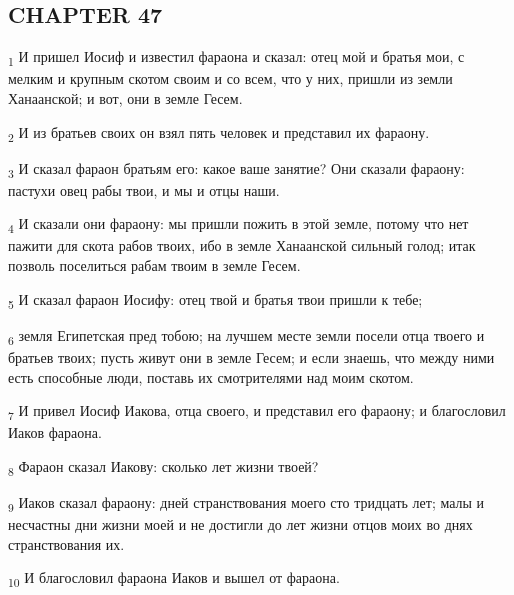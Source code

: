 \subsection{CHAPTER 47}
\begin{tcolorbox}
\textsubscript{1} И пришел Иосиф и известил фараона и сказал: отец мой и братья мои, с мелким и крупным скотом своим и со всем, что у них, пришли из земли Ханаанской; и вот, они в земле Гесем.
\end{tcolorbox}
\begin{tcolorbox}
\textsubscript{2} И из братьев своих он взял пять человек и представил их фараону.
\end{tcolorbox}
\begin{tcolorbox}
\textsubscript{3} И сказал фараон братьям его: какое ваше занятие? Они сказали фараону: пастухи овец рабы твои, и мы и отцы наши.
\end{tcolorbox}
\begin{tcolorbox}
\textsubscript{4} И сказали они фараону: мы пришли пожить в этой земле, потому что нет пажити для скота рабов твоих, ибо в земле Ханаанской сильный голод; итак позволь поселиться рабам твоим в земле Гесем.
\end{tcolorbox}
\begin{tcolorbox}
\textsubscript{5} И сказал фараон Иосифу: отец твой и братья твои пришли к тебе;
\end{tcolorbox}
\begin{tcolorbox}
\textsubscript{6} земля Египетская пред тобою; на лучшем месте земли посели отца твоего и братьев твоих; пусть живут они в земле Гесем; и если знаешь, что между ними есть способные люди, поставь их смотрителями над моим скотом.
\end{tcolorbox}
\begin{tcolorbox}
\textsubscript{7} И привел Иосиф Иакова, отца своего, и представил его фараону; и благословил Иаков фараона.
\end{tcolorbox}
\begin{tcolorbox}
\textsubscript{8} Фараон сказал Иакову: сколько лет жизни твоей?
\end{tcolorbox}
\begin{tcolorbox}
\textsubscript{9} Иаков сказал фараону: дней странствования моего сто тридцать лет; малы и несчастны дни жизни моей и не достигли до лет жизни отцов моих во днях странствования их.
\end{tcolorbox}
\begin{tcolorbox}
\textsubscript{10} И благословил фараона Иаков и вышел от фараона.
\end{tcolorbox}
